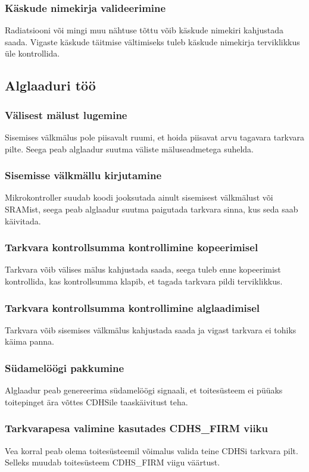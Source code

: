 \documentclass[12pt,a4paper]{article}
\begin{document}
\subsubsection{Käskude nimekirja valideerimine}
Radiatsiooni või mingi muu nähtuse tõttu võib käskude nimekiri kahjustada saada.
Vigaste käskude täitmise vältimiseks tuleb käskude nimekirja terviklikkus üle
kontrollida.

\subsection{Alglaaduri töö}
\subsubsection{Välisest mälust lugemine}
Sisemises välkmälus pole piisavalt ruumi, et hoida piisavat arvu tagavara
tarkvara pilte. Seega peab alglaadur suutma väliste mäluseadmetega suhelda.

\subsubsection{Sisemisse välkmällu kirjutamine}
Mikrokontroller suudab koodi jooksutada ainult sisemisest välkmälust või
SRAMist, seega peab alglaadur suutma paigutada tarkvara sinna, kus seda saab
käivitada.

\subsubsection{Tarkvara kontrollsumma kontrollimine kopeerimisel}
Tarkvara võib välises mälus kahjustada saada, seega tuleb enne kopeerimist
kontrollida, kas kontrollsumma klapib, et tagada tarkvara pildi terviklikkus.

\subsubsection{Tarkvara kontrollsumma kontrollimine alglaadimisel}
Tarkvara võib sisemises välkmälus kahjustada saada ja vigast tarkvara ei tohiks
käima panna.

\subsubsection{Südamelöögi pakkumine}
Alglaadur peab genereerima südamelöögi signaali, et toitesüsteem ei püüaks
toitepinget ära võttes CDHSile taaskäivitust teha.

\subsubsection{Tarkvarapesa valimine kasutades CDHS\_FIRM viiku}
Vea korral peab olema toitesüsteemil võimalus valida teine CDHSi tarkvara pilt.
Selleks muudab toitesüsteem CDHS\_FIRM viigu väärtust.
\end{document}
